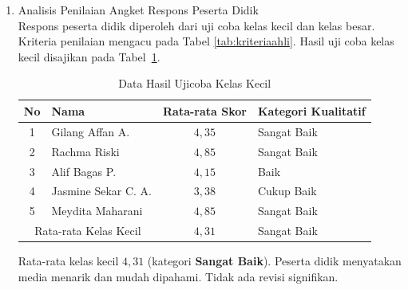 \begin{enumerate}
    \hspace*{1cm}Rata-rata skor kedua validator adalah \(4{,}66\) (kategori \textbf{Sangat Baik}), dengan aspek kualitas perangkat lunak sangat baik (rata-rata \(4{,}83\)).

    \item Analisis Penilaian Angket Respons Peserta Didik\\
    \hspace*{1cm}Respons peserta didik diperoleh dari uji coba kelas kecil dan kelas besar. Kriteria penilaian mengacu pada Tabel \ref{tab:kriteriaahli}. Hasil uji coba kelas kecil disajikan pada Tabel~\ref{ujikelaskecil}.
    \begin{table}[H]
        \centering
        \caption{Data Hasil Ujicoba Kelas Kecil}
        \label{ujikelaskecil}
        \begin{tabular}{|c|l|c|l|}
            \hline
            \textbf{No} & \textbf{Nama} & \textbf{Rata-rata Skor} & \textbf{Kategori Kualitatif} \\
            \hline
            1 & Gilang Affan A. & \(4{,}35\) & Sangat Baik \\
            2 & Rachma Riski & \(4{,}85\) & Sangat Baik \\
            3 & Alif Bagas P. & \(4{,}15\) & Baik \\
            4 & Jasmine Sekar C. A. & \(3{,}38\) & Cukup Baik \\
            5 & Meydita Maharani & \(4{,}85\) & Sangat Baik \\
            \hline
            \multicolumn{2}{|c|}{Rata-rata Kelas Kecil} & \(4{,}31\) & Sangat Baik \\
            \hline
        \end{tabular}
    \end{table}
    Rata-rata kelas kecil \(4{,}31\) (kategori \textbf{Sangat Baik}). Peserta didik menyatakan media menarik dan mudah dipahami. Tidak ada revisi signifikan.
    

\end{enumerate}

